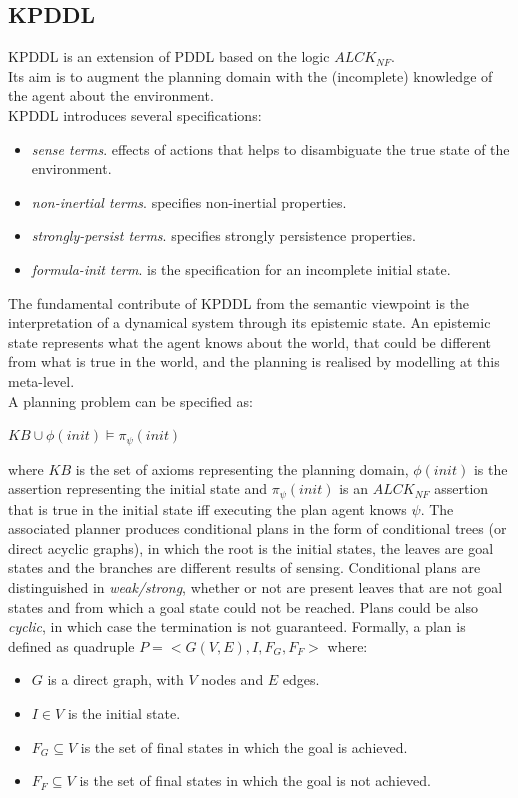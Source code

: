 \documentclass[pdftex,12pt,a4paper]{report}
\begin{document}
\subsection{KPDDL}\label{kpddl_descr}
KPDDL\cite{iocchi2003}%
is an extension of PDDL based on the logic $ALCK_{NF}$. 
\\\noindent Its aim is to augment the planning domain with the (incomplete) knowledge of the agent about the environment. 
\\\noindent KPDDL introduces several specifications:
\begin{itemize}
\item \textit{sense terms}. effects of actions that helps to disambiguate the true state of the environment.
\item \textit{non-inertial terms}. specifies non-inertial properties. 
\item \textit{strongly-persist terms}. specifies strongly persistence properties.
\item \textit{formula-init term}. is the specification for an incomplete initial state.
\end{itemize}
The fundamental contribute of KPDDL from the semantic viewpoint is the interpretation of a dynamical system through its epistemic state. An epistemic state represents what the agent knows about the world, that could be different from what is true in the world, and the planning is realised by modelling at this meta-level. 
\\\noindent A planning problem can be specified as:
\begin{center}
$KB \cup \phi (init) \models \pi_{\psi} (init)$
\end{center}
where $KB$ is the set of axioms representing the planning domain, $\phi (init)$ is the assertion representing the initial state and $\pi_{\psi} (init)$ is an $ALCK_{NF}$ assertion that is true in the initial state iff executing the plan agent knows $\psi$. 
\noindent The associated planner produces conditional plans in the form of conditional trees (or direct acyclic graphs), in which the root is the initial states, the leaves are goal states and the branches are different results of sensing. Conditional plans are distinguished in \textit{weak/strong}, whether or not are present leaves that are not goal states and from which a goal state could not be reached. Plans could be also \textit{cyclic}, in which case the termination is not guaranteed.
Formally, a plan is defined as quadruple $P = <G(V,E),I,F_G,F_F>$ where:
\begin{itemize}
\item $G$ is a direct graph, with $V$ nodes and $E$ edges.
\item $I \in V$ is the initial state.
\item $F_G \subseteq V$ is the set of final states in which the goal is achieved.
\item $F_F \subseteq V$ is the set of final states in which the goal is not achieved.
\end{itemize}
\end{document}
